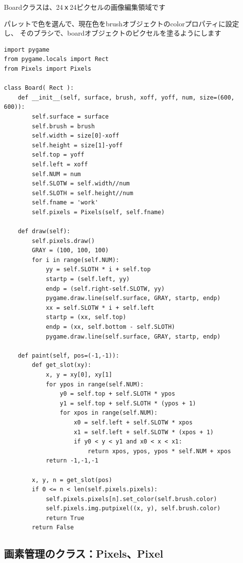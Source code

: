 \documentclass[uplatex,a4paper,11pt,oneside,openany]{jsbook}
\begin{document}
Boardクラスは、24ｘ24ピクセルの画像編集領域です

パレットで色を選んで、現在色をbrushオブジェクトのcolorプロパティに設定し、
そのブラシで、boardオブジェクトのピクセルを塗るようにします

\begin{lstlisting}[caption=class Board,label=pr05]
import pygame
from pygame.locals import Rect
from Pixels import Pixels

class Board( Rect ):
    def __init__(self, surface, brush, xoff, yoff, num, size=(600, 600)):
        self.surface = surface
        self.brush = brush
        self.width = size[0]-xoff
        self.height = size[1]-yoff
        self.top = yoff
        self.left = xoff
        self.NUM = num
        self.SLOTW = self.width//num
        self.SLOTH = self.height//num
        self.fname = 'work'
        self.pixels = Pixels(self, self.fname)

    def draw(self):
        self.pixels.draw()
        GRAY = (100, 100, 100)
        for i in range(self.NUM):
            yy = self.SLOTH * i + self.top
            startp = (self.left, yy)
            endp = (self.right-self.SLOTW, yy)
            pygame.draw.line(self.surface, GRAY, startp, endp)
            xx = self.SLOTW * i + self.left
            startp = (xx, self.top)
            endp = (xx, self.bottom - self.SLOTH)
            pygame.draw.line(self.surface, GRAY, startp, endp)

    def paint(self, pos=(-1,-1)):
        def get_slot(xy):
            x, y = xy[0], xy[1]
            for ypos in range(self.NUM):
                y0 = self.top + self.SLOTH * ypos
                y1 = self.top + self.SLOTH * (ypos + 1)
                for xpos in range(self.NUM):
                    x0 = self.left + self.SLOTW * xpos
                    x1 = self.left + self.SLOTW * (xpos + 1)
                    if y0 < y < y1 and x0 < x < x1:
                        return xpos, ypos, ypos * self.NUM + xpos
            return -1,-1,-1

        x, y, n = get_slot(pos)
        if 0 <= n < len(self.pixels.pixels):
            self.pixels.pixels[n].set_color(self.brush.color)
            self.pixels.img.putpixel((x, y), self.brush.color)
            return True
        return False
\end{lstlisting}

\subsection{画素管理のクラス：Pixels、Pixel}
\end{document}
